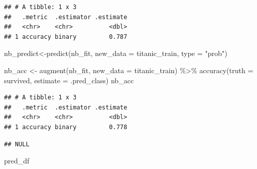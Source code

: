 \documentclass[
]{article}
\newenvironment{Shaded}{\begin{snugshade}}{\end{snugshade}}
\newcommand{\AttributeTok}[1]{\textcolor[rgb]{0.77,0.63,0.00}{#1}}
\newcommand{\FunctionTok}[1]{\textcolor[rgb]{0.00,0.00,0.00}{#1}}
\newcommand{\NormalTok}[1]{#1}
\newcommand{\OtherTok}[1]{\textcolor[rgb]{0.56,0.35,0.01}{#1}}
\newcommand{\SpecialCharTok}[1]{\textcolor[rgb]{0.00,0.00,0.00}{#1}}
\newcommand{\StringTok}[1]{\textcolor[rgb]{0.31,0.60,0.02}{#1}}
\begin{document}
\begin{verbatim}
## # A tibble: 1 x 3
##   .metric  .estimator .estimate
##   <chr>    <chr>          <dbl>
## 1 accuracy binary         0.787
\end{verbatim}

\begin{Shaded}
\begin{Highlighting}[]
\NormalTok{nb\_predict}\OtherTok{\textless{}{-}}\FunctionTok{predict}\NormalTok{(nb\_fit, }\AttributeTok{new\_data =}\NormalTok{ titanic\_train, }\AttributeTok{type =} \StringTok{"prob"}\NormalTok{)}

\NormalTok{nb\_acc }\OtherTok{\textless{}{-}} \FunctionTok{augment}\NormalTok{(nb\_fit, }\AttributeTok{new\_data =}\NormalTok{ titanic\_train) }\SpecialCharTok{\%\textgreater{}\%}
  \FunctionTok{accuracy}\NormalTok{(}\AttributeTok{truth =}\NormalTok{ survived, }\AttributeTok{estimate =}\NormalTok{ .pred\_class)}
\NormalTok{nb\_acc}
\end{Highlighting}
\end{Shaded}

\begin{verbatim}
## # A tibble: 1 x 3
##   .metric  .estimator .estimate
##   <chr>    <chr>          <dbl>
## 1 accuracy binary         0.778
\end{verbatim}

\begin{Shaded}
\end{Shaded}

\begin{verbatim}
## NULL
\end{verbatim}

\begin{Shaded}
\begin{Highlighting}[]
\NormalTok{pred\_df}
\end{Highlighting}
\end{Shaded}
\end{document}
